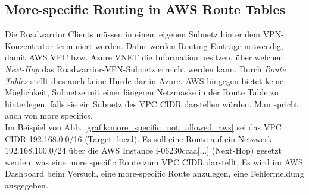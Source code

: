 \subsection{More-specific Routing in AWS Route Tables}
Die \gls{Roadwarrior} \gls{Client}s müssen in einem eigenen Subnetz \glqq hinter\grqq{} dem \gls{VPN-Konzentrator} terminiert werden. Dafür werden Routing-Einträge notwendig, damit AWS \gls{VPC} bzw. Azure \gls{VNET} die Information besitzen, über welchen \textit{Next-Hop} das \gls{Roadwarrior}-\gls{VPN}-Subnetz erreicht werden kann. Durch \textit{Route Tables} stellt dies auch keine Hürde dar in Azure. AWS hingegen bietet keine Möglichkeit, Subnetze mit einer längeren Netzmaske in der Route Table zu hinterlegen, falls sie ein Subnetz des \gls{VPC} \gls{CIDR} darstellen würden. Man spricht auch von \glqq more specifics\grqq{}.\\
Im Beispiel von Abb. \ref{grafik:more_specific_not_allowed_aws} sei das \gls{VPC} \gls{CIDR} 192.168.0.0/16 (Target: local). Es soll eine Route auf ein Netzwerk 192.168.100.0/24 über die AWS Instance \glqq i-06230ccaa[...]\grqq{} (Next-Hop) gesetzt werden, was eine more specific Route zum \gls{VPC} \gls{CIDR} darstellt.
Es wird im AWS Dashboard beim Versuch, eine more-specific Route anzulegen, eine Fehlermeldung ausgegeben.

